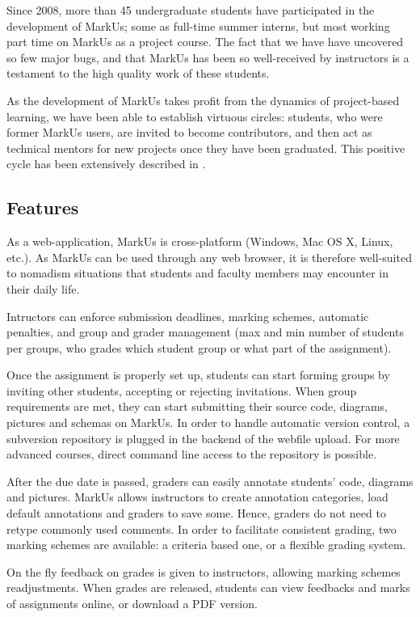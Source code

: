 \documentclass[twocolumn,10pt]{asme2e}
\begin{document}
Since 2008, more than 45 undergraduate students have participated in the development of MarkUs; some as full-time summer interns, but most working part time on MarkUs as a project course. The fact that we have have uncovered so few major bugs, and that MarkUs has been so well-received by instructors is a testament to the high quality work of these students. 

As the development of MarkUs takes profit from the dynamics of project-based learning, we have been able to establish virtuous circles: students, who were former MarkUs users, are invited to become contributors, and then act as technical mentors for new projects once they have been graduated. This positive cycle has been extensively described in \cite{magnin-qpes-2011}.

\subsection*{Features}

As a web-application, MarkUs is cross-platform (Windows, Mac OS X, Linux,
etc.). As MarkUs can be used through any web browser, it is therefore
well-suited to nomadism situations that students and faculty members may
encounter in their daily life.

Intructors can enforce submission deadlines, marking schemes, automatic
penalties, and group and grader management (max and min number of students per
groups, who grades which student group or what part of the assignment).

Once the assignment is properly set up, students can start forming groups by
inviting other students, accepting or rejecting invitations. When group
requirements are met, they can start submitting their source code, diagrams,
pictures and schemas on MarkUs. In order to handle automatic version control,
a subversion repository is plugged in the backend of the webfile upload. For
more advanced courses, direct command line access to the repository is
possible.

After the due date is passed, graders can easily annotate students' code,
diagrams and pictures. MarkUs allows instructors to create annotation
categories, load default annotations and graders to save some. Hence, graders
do not need to retype commonly used comments. In order to facilitate
consistent grading, two marking schemes are available: a criteria based one,
or a flexible grading system.

On the fly feedback on grades is given to instructors, allowing marking
schemes readjustments. When grades are released, students can view feedbacks
and marks of assignments online, or download a PDF version.
\end{document}
